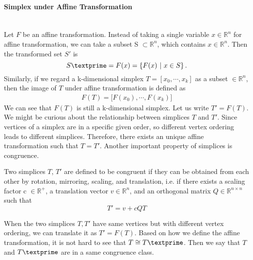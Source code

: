     \paragraph{Simplex under Affine Transformation}\mbox{}\\
    Let $F$ be an affine transformation. 
    Instead of taking a single variable $x\in\mathbb{R}^n$ for affine transformation, we can take a subset S $\subset\mathbb{R}^n$, which contains $x\in\mathbb{R}^n$. Then the transformed set $S'$ is
    \begin{equation*}
    S\textprime= {F}(x) = \left\{{F}(x) ~|~ x\in S \right\}.
    \end{equation*}
    Similarly, if we regard a k-dimensional simplex ${T} = [{x_0, \cdots, x_k}]$ as a subset $\in\mathbb{R}^n$, then the image of ${T}$ under affine transformation is defined as
    \begin{equation*}
    \begin{split}
    {F}({T}) = \big[{F}(x_0), \cdots , {F}(x_k)\big]
    \end{split}
    \end{equation*}
    We can see that $F(T)$ is still a k-dimensional simplex. Let us write $T' = F(T)$. We might be curious about the relationship between simplices $T$ and $T'$. Since vertices of a simplex are in a specific given order, so different vertex ordering leads to different simplices. Therefore, there exists an unique affine transformation such that $T = T'$. Another important property of simplices is congruence.

    \begin{definition*}
    Two simplices $T$, $T'$ are defined to be congruent if they can be obtained from each other by rotation, mirroring, scaling, and translation, i.e. if there exists a scaling factor c $\in\mathbb{R}^{+}$, a translation vector $v\in\mathbb{R}^n$, and an orthogonal matrix $Q\in\mathbb{R}^{n\times n}$ such that
    \begin{equation*}
    T' = v + cQT
    \end{equation*}
    \end{definition*}
    \noindent
    When the two simplices $T, T'$ have same vertices but with different vertex ordering, we can translate it as $T' = F(T)$. Based on how we define the affine transformation, it is not hard to see that ${T} \cong {T}\textprime$. Then we say that ${T}$ and ${T}\textprime$ are in a same congruence class.